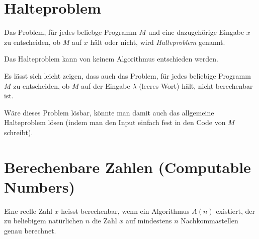 \section{Halteproblem}
\begin{mydefinition}[Halteproblem]\label{mydefinition:halteproblem}
Das Problem, für jedes beliebge Programm $M$ und eine dazugehörige Eingabe $x$ zu entscheiden, ob $M$ auf $x$ hält oder nicht, wird \emph{Halteproblem} genannt.
\end{mydefinition}

\begin{mytheorem}[Halteproblem]
Das Halteproblem kann von keinem Algorithmus entschieden werden.
\end{mytheorem}

\begin{myremark}\label{myremark:H_lambda}
	Es lässt sich leicht zeigen, dass auch das Problem, für jedes beliebige Programm $M$ zu entscheiden, ob $M$ auf der Eingabe $\lambda$ (leeres Wort) hält, nicht berechenbar ist.
	\begin{myproof}
		Wäre dieses Problem lösbar, könnte man damit auch das allgemeine Halteproblem lösen (indem man den Input einfach fest in den Code von $M$ schreibt).
	\end{myproof}
\end{myremark}


\section{Berechenbare Zahlen (Computable Numbers)}
\begin{mydefinition}\label{mydefinition:comp_numb}
	Eine reelle Zahl $x$ heisst berechenbar, wenn ein Algorithmus $A(n)$ existiert, der zu beliebigem natürlichen $n$ die Zahl $x$ auf mindestens $n$ Nachkommastellen genau berechnet.
\end{mydefinition}

